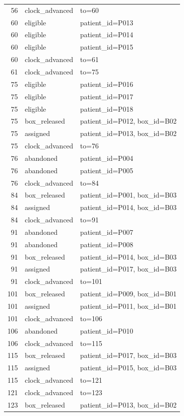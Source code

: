 \begin{longtable}{r p{2.2cm} p{4.2cm}}
56 & clock\_advanced & to=60 \\
60 & eligible & patient\_id=P013 \\
60 & eligible & patient\_id=P014 \\
60 & eligible & patient\_id=P015 \\
60 & clock\_advanced & to=61 \\
61 & clock\_advanced & to=75 \\
75 & eligible & patient\_id=P016 \\
75 & eligible & patient\_id=P017 \\
75 & eligible & patient\_id=P018 \\
75 & box\_released & patient\_id=P012, box\_id=B02 \\
75 & assigned & patient\_id=P013, box\_id=B02 \\
75 & clock\_advanced & to=76 \\
76 & abandoned & patient\_id=P004 \\
76 & abandoned & patient\_id=P005 \\
76 & clock\_advanced & to=84 \\
84 & box\_released & patient\_id=P001, box\_id=B03 \\
84 & assigned & patient\_id=P014, box\_id=B03 \\
84 & clock\_advanced & to=91 \\
91 & abandoned & patient\_id=P007 \\
91 & abandoned & patient\_id=P008 \\
91 & box\_released & patient\_id=P014, box\_id=B03 \\
91 & assigned & patient\_id=P017, box\_id=B03 \\
91 & clock\_advanced & to=101 \\
101 & box\_released & patient\_id=P009, box\_id=B01 \\
101 & assigned & patient\_id=P011, box\_id=B01 \\
101 & clock\_advanced & to=106 \\
106 & abandoned & patient\_id=P010 \\
106 & clock\_advanced & to=115 \\
115 & box\_released & patient\_id=P017, box\_id=B03 \\
115 & assigned & patient\_id=P015, box\_id=B03 \\
115 & clock\_advanced & to=121 \\
121 & clock\_advanced & to=123 \\
123 & box\_released & patient\_id=P013, box\_id=B02 \\

\end{longtable}
